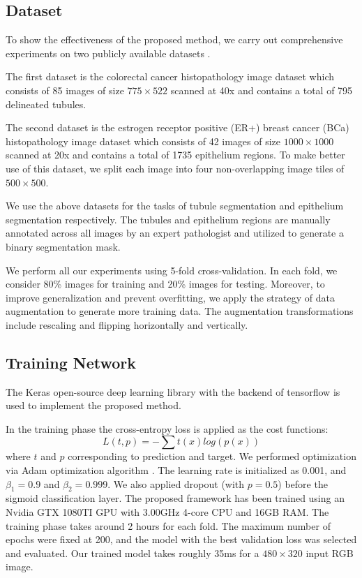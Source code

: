 \documentclass[10pt,twocolumn]{article}
\begin{document}
\subsection{Dataset} \label{s41}

To show the effectiveness of the proposed method, we carry out comprehensive experiments on two publicly available datasets \cite{r6}.

The first dataset is the colorectal cancer histopathology image dataset which consists of 85 images of size $775\times522$  scanned at 40x and contains a total of 795 delineated tubules.

The second dataset is the estrogen receptor positive (ER+) breast cancer (BCa) histopathology image dataset which consists of 42 images of size $1000\times1000$ scanned at 20x and contains a total of 1735 epithelium regions. To make better use of this dataset, we split each image into four non-overlapping image tiles of $500\times500$.

We use the above datasets for the tasks of tubule segmentation and epithelium segmentation respectively. The tubules and epithelium regions are manually annotated across all images by an expert pathologist and utilized to generate a binary segmentation mask.

We perform all our experiments using 5-fold cross-validation. In each fold, we consider 80\% images for training and 20\% images for testing. Moreover, to improve generalization and prevent overfitting, we apply the strategy of data augmentation to generate more training data. The augmentation transformations include rescaling and flipping horizontally and vertically.
\subsection{Training Network}\label{s42}
The Keras open-source deep learning library \cite{r17} with the backend of tensorflow \cite{r18} is used to implement the proposed method.

In the training phase the cross-entropy loss is applied as the cost functions:
  \begin{equation}
  L(t,p)= - \sum t(x)log(p(x))
\end{equation}
where $t$ and $p$ corresponding to prediction and target.
We performed optimization via Adam optimization algorithm \cite{r19}. The learning rate is initialized as 0.001, and $\beta_{1}=0.9$ and $\beta_{2}=0.999$.
We also applied dropout \cite{r2} (with $p=0.5$) before the sigmoid classification layer.
The proposed framework has been trained using an Nvidia GTX 1080TI GPU with 3.00GHz 4-core CPU and 16GB RAM. The training phase takes around 2 hours for each fold. The maximum number of epochs were fixed at 200, and the model with the best validation loss was selected and evaluated. Our trained model takes roughly 35ms for a $480\times320$ input RGB image.
\end{document}
